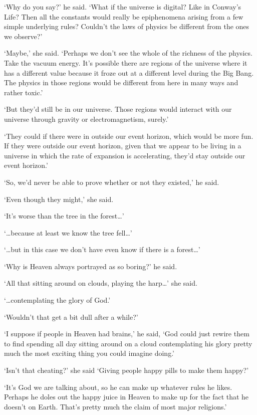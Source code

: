 `Why do you say?' he said. `What if the universe is digital? Like in Conway's
Life? Then all the constants would really be epiphenomena arising
from a few simple underlying rules? Couldn't the laws of physics be different from the ones we observe?'

`Maybe,' she said. `Perhaps we don't see the whole of the richness of the
physics. Take the vacuum energy. It's possible there are
regions of the universe where it has a different value
because it froze out at a different level during the Big Bang. The
physics in those regions would be different from here in many
ways and rather toxic.'

`But they'd still be in our universe. Those regions would interact
with our universe through gravity or electromagnetism, surely.'

`They could if there were in outside our event horizon, which would
be more fun. If they were outside our event horizon, given that we
appear to be living in a universe in which the rate of expansion is
accelerating, they'd stay outside our event horizon.'

`So, we'd never be able to prove whether or not they existed,' he said.

`Even though they might,' she said.

`It's worse than the tree in the forest\dots'

`{\dots}because at least we know the tree fell\dots'

`{\dots}but in this case we don't have even know if there is a forest\dots'

\majorbreak
`Why is Heaven always portrayed as so boring?' he said.

`All that sitting around on clouds, playing the harp{\dots}' she said.

`{\dots}contemplating the glory of God.'

`Wouldn't that get a bit dull after a while?'

`I suppose if people in Heaven had brains,' he said, `God could just rewire them to find spending all day sitting around on a cloud contemplating his glory pretty much the most exciting thing you could imagine doing.'

`Isn't that cheating?' she said `Giving people happy pills to make them happy?'

`It's God we are talking about, so he can make up whatever
rules he likes. Perhaps he doles out the happy juice in Heaven to
make up for the fact that he doesn't on Earth. That's pretty much
the claim of most major religions.'

